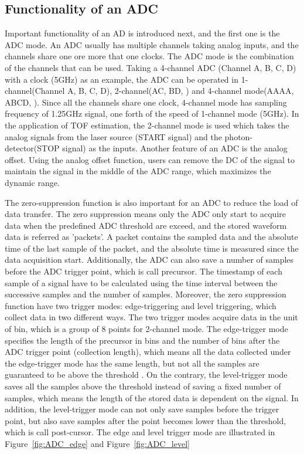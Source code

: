 \subsection{Functionality of an ADC}
Important functionality of an AD is introduced next, and the first one is the ADC mode. An ADC usually has multiple channels taking analog inputs, and the channels share one ore more that one clocks. The ADC mode is the combination of the channels that can be used. Taking a 4-channel ADC (Channel A, B, C, D) with a clock (5GHz) as an example, the ADC can be operated in 1-channel(Channel A, B, C, D), 2-channel(\eg AC, BD, \etc) and 4-channel mode(\eg AAAA, ABCD, \etc). Since all the channels share one clock, 4-channel mode has sampling frequency of 1.25GHz signal, one forth of the speed of 1-channel mode (5GHz). In the application of TOF estimation, the 2-channel mode is used which takes the analog signals from the laser source (START signal) and the photon-detector(STOP signal) as the inputs. Another feature of an ADC is the analog offset. Using the analog offset function, users can remove the DC of the signal to maintain the signal in the middle of the ADC range, which maximizes the dynamic range.\par
The zero-suppression function is also important for an ADC to reduce the load of data transfer. The zero suppression means only the ADC only start to acquire data when the predefined ADC threshold are exceed, and the stored waveform data is referred as 'packets'. A packet contains the sampled data and the absolute time of the last sample of the packet, and the absolute time is measured since the data acquisition start. Additionally, the ADC can also save a number of samples before the ADC trigger point, which is call precursor. The timestamp of each sample of a signal have to be calculated using the time interval between the successive samples and the number of samples. Moreover, the zero suppression function have two trigger modes: edge-triggering and level triggering, which collect data in two different ways. The two trigger modes acquire data in the unit of bin, which is a group of 8 points for 2-channel mode. The edge-trigger mode specifies the length of the precursor in bins and the number of bins after the ADC trigger point (collection length), which means all the data collected under the edge-trigger mode has the same length, but not all the samples are guaranteed to be above the threshold . On the contrary, the level-trigger mode saves all the samples above the threshold instead of saving a fixed number of samples, which means the length of the stored data is dependent on the signal. In addition, the level-trigger mode can not only save samples before the trigger point, but also save samples after the point becomes lower than the threshold, which is call post-cursor. The edge and level trigger mode are illustrated in Figure~\ref{fig:ADC_edge} and Figure~\ref{fig:ADC_level} 
